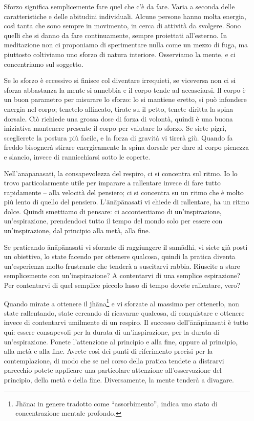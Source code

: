
Sforzo significa semplicemente fare quel che c'è da fare. Varia a
seconda delle caratteristiche e delle abitudini individuali. Alcune
persone hanno molta energia, così tanta che sono sempre in movimento, in
cerca di attività da svolgere. Sono quelli che si danno da fare
continuamente, sempre proiettati all'esterno. In meditazione non ci
proponiamo di sperimentare nulla come un mezzo di fuga, ma piuttosto
coltiviamo uno sforzo di natura interiore. Osserviamo la mente, e ci
concentriamo sul soggetto.

Se lo sforzo è eccessivo si finisce col diventare irrequieti, se
viceversa non ci si sforza abbastanza la mente si annebbia e il corpo
tende ad accasciarsi. Il corpo è un buon parametro per misurare lo
sforzo: lo si mantiene eretto, si può infondere energia nel corpo;
tenetelo allineato, tirate su il petto, tenete diritta la spina dorsale.
Ciò richiede una grossa dose di forza di volontà, quindi è una buona
iniziativa mantenere presente il corpo per valutare lo sforzo. Se siete
pigri, sceglierete la postura più facile, e la forza di gravità vi
tirerà giù. Quando fa freddo bisognerà stirare energicamente la spina
dorsale per dare al corpo pienezza e slancio, invece di rannicchiarsi
sotto le coperte.

Nell'ānāpānasati, la consapevolezza del respiro, ci si concentra sul
ritmo. Io lo trovo particolarmente utile per imparare a rallentare
invece di fare tutto rapidamente – alla velocità del pensiero; ci si
concentra su un ritmo che è molto più lento di quello del pensiero.
L'ānāpānasati vi chiede di rallentare, ha un ritmo dolce. Quindi
smettiamo di pensare: ci accontentiamo di un'inspirazione,
un'espirazione, prendendoci tutto il tempo del mondo solo per essere con
un'inspirazione, dal principio alla metà, alla fine.

Se praticando ānāpānasati vi sforzate di raggiungere il samādhi, vi
siete già posti un obiettivo, lo state facendo per ottenere qualcosa,
quindi la pratica diventa un'esperienza molto frustrante che tenderà a
suscitarvi rabbia. Riuscite a stare semplicemente con un'inspirazione? A
contentarvi di una semplice espirazione? Per contentarvi di quel
semplice piccolo lasso di tempo dovete rallentare, vero?

Quando mirate a ottenere il jhāna\footnote{Jhāna: in genere tradotto come “assorbimento”, indica
uno stato di concentrazione mentale profondo.} e vi sforzate al massimo
per ottenerlo, non state rallentando, state cercando di ricavarne
qualcosa, di conquistare e ottenere invece di contentarvi umilmente di
un respiro. Il successo dell'ānāpānasati è tutto qui: essere consapevoli
per la durata di un'inspirazione, per la durata di un'espirazione.
Ponete l'attenzione al principio e alla fine, oppure al principio, alla
metà e alla fine. Avrete così dei punti di riferimento precisi per la
contemplazione, di modo che se nel corso della pratica tendete a
distrarvi parecchio potete applicare una particolare attenzione
all'osservazione del principio, della metà e della fine. Diversamente,
la mente tenderà a divagare.


